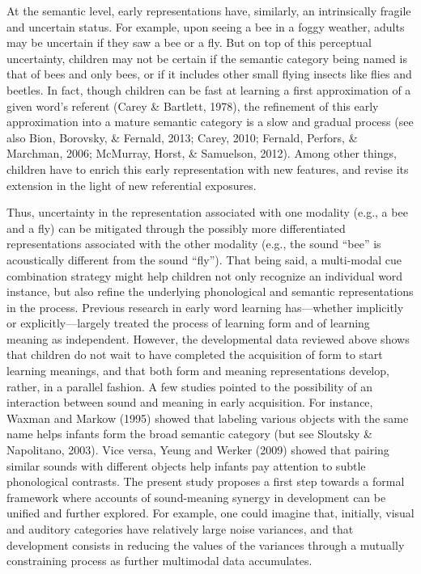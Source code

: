 \documentclass[english,man]{apa6}
\theoremstyle{definition}
\theoremstyle{definition}
\theoremstyle{definition}
\theoremstyle{remark}
\begin{document}
At the semantic level, early representations have, similarly, an
intrinsically fragile and uncertain status. For example, upon seeing a
bee in a foggy weather, adults may be uncertain if they saw a bee or a
fly. But on top of this perceptual uncertainty, children may not be
certain if the semantic category being named is that of bees and only
bees, or if it includes other small flying insects like flies and
beetles. In fact, though children can be fast at learning a first
approximation of a given word's referent (Carey \& Bartlett, 1978), the
refinement of this early approximation into a mature semantic category
is a slow and gradual process (see also Bion, Borovsky, \& Fernald,
2013; Carey, 2010; Fernald, Perfors, \& Marchman, 2006; McMurray, Horst,
\& Samuelson, 2012). Among other things, children have to enrich this
early representation with new features, and revise its extension in the
light of new referential exposures.

Thus, uncertainty in the representation associated with one modality
(e.g., a bee and a fly) can be mitigated through the possibly more
differentiated representations associated with the other modality (e.g.,
the sound \enquote{bee} is acoustically different from the sound
\enquote{fly}). That being said, a multi-modal cue combination strategy
might help children not only recognize an individual word instance, but
also refine the underlying phonological and semantic representations in
the process. Previous research in early word learning has---whether
implicitly or explicitly---largely treated the process of learning form
and of learning meaning as independent. However, the developmental data
reviewed above shows that children do not wait to have completed the
acquisition of form to start learning meanings, and that both form and
meaning representations develop, rather, in a parallel fashion. A few
studies pointed to the possibility of an interaction between sound and
meaning in early acquisition. For instance, Waxman and Markow (1995)
showed that labeling various objects with the same name helps infants
form the broad semantic category (but see Sloutsky \& Napolitano, 2003).
Vice versa, Yeung and Werker (2009) showed that pairing similar sounds
with different objects help infants pay attention to subtle phonological
contrasts. The present study proposes a first step towards a formal
framework where accounts of sound-meaning synergy in development can be
unified and further explored. For example, one could imagine that,
initially, visual and auditory categories have relatively large noise
variances, and that development consists in reducing the values of the
variances through a mutually constraining process as further multimodal
data accumulates.
\end{document}
